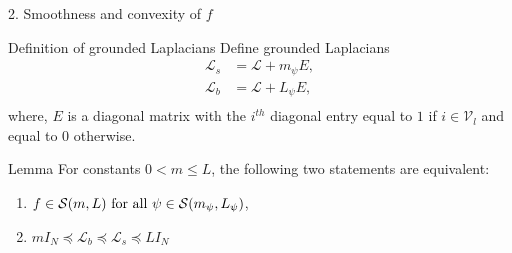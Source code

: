 \documentclass{beamer}
\begin{document}
\begin{frame}{2. Smoothness and convexity of $f$}
\begin{block}{Definition of grounded Laplacians}
	Define grounded Laplacians
	\begin{equation} \label{eq:Lgs_defn}
		\begin{split}
			\mathcal{L}_s&=\mathcal{L}+m_{\psi} E, \\
			\mathcal{L}_b&=\mathcal{L}+L_{\psi} E, \\
		\end{split}
	\end{equation}
	where, $E$ is a diagonal matrix with the $i^{th}$ diagonal entry equal to $1$ if $i \in \mathcal{V}_l$ and equal to $0$ otherwise.
\end{block}
\pause 
\begin{block}{Lemma}
	For constants $0<m \leq L$, the following two statements are equivalent:
\begin{enumerate}
	\item $f\in \mathcal{S}(m,L) \textnormal{ for all } \psi \in \mathcal{S}(m_{\psi},L_{\psi})$,
	\item $m I_N \preceq  \mathcal{L}_b \preceq \mathcal{L}_s \preceq L I_N$
\end{enumerate}
\end{block}
\end{frame}
\end{document}
